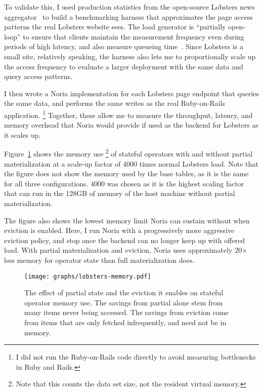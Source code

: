 To validate this, I used production statistics from the open-source Lobsters
news aggregator~\cite{lobsters,lobsters-data} to build a benchmarking harness
that approximates the page access patterns the real Lobsters website sees. The
load generator is ``partially open-loop'' to ensure that clients maintain the
measurement frequency even during periods of high latency, and also measure
queueing time~\cite{frank-open-loop,open-loop-cautionary-tale}. Since Lobsters
is a small site, relatively speaking, the harness also lets me to proportionally
scale up the access frequency to evaluate a larger deployment with the same
data and query access patterns.

I then wrote a Noria implementation for each Lobsters page endpoint that
queries the same data, and performs the same writes as the real Ruby-on-Rails
application.%
\footnote{I did not run the Ruby-on-Rails code directly to avoid measuring
bottlenecks in Ruby and Rails.}
Together, these allow me to measure the throughput, latency, and memory overhead
that Noria would provide if used as the backend for Lobsters as it scales up.

Figure~\ref{f:lobsters-memory} shows the memory use%
\footnote{Note that this counts the data set size, not the resident virtual
memory.}
of stateful operators with
and without partial materialization at a scale-up factor of 4000 times normal
Lobsters load. Note that the figure does not show the memory used by the base
tables, as it is the same for all three configurations. 4000 was chosen as it is
the highest scaling factor that can run in the 128GB of memory of the host
machine without partial materialization.

The figure also shows the lowest memory limit Noria can sustain without when
eviction is enabled. Here, I run Noria with a progressively more aggressive
eviction policy, and stop once the backend can no longer keep up with offered
load. With partial materialization and eviction, Noria uses approximately
20$\times$ less memory for operator state than full materialization does.

\begin{figure}[ht]
  \centering
  \texttt{[image: graphs/lobsters-memory.pdf]}
  \caption{The effect of partial state and the eviction it enables on stateful
  operator memory use. The savings from partial alone stem from many items never
  being accessed. The savings from eviction come from items that are only
  fetched infrequently, and need not be in memory.}
  \label{f:lobsters-memory}
\end{figure}


